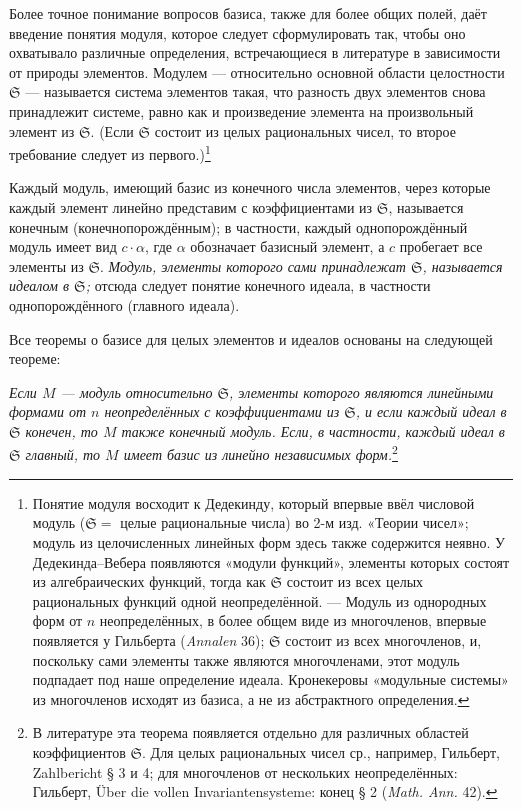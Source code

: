 \documentclass[11pt]{article}
\providecommand{\frS}{\mathfrak S}
\begin{document}
Более точное понимание вопросов базиса, также для более общих полей, даёт введение понятия модуля, которое следует сформулировать так, чтобы оно охватывало различные определения, встречающиеся в литературе в зависимости от природы элементов. Модулем --- относительно основной области целостности \(\frS\) --- называется система элементов такая, что разность двух элементов снова принадлежит системе, равно как и произведение элемента на произвольный элемент из \(\frS\). (Если \(\frS\) состоит из целых рациональных чисел, то второе требование следует из первого.)\footnote{Понятие модуля восходит к Дедекинду, который впервые ввёл числовой модуль (\(\frS=\) целые рациональные числа) во 2-м изд. «Теории чисел»; модуль из целочисленных линейных форм здесь также содержится неявно. У Дедекинда--Вебера появляются «модули функций», элементы которых состоят из алгебраических функций, тогда как \(\frS\) состоит из всех целых рациональных функций одной неопределённой. --- Модуль из однородных форм от \(n\) неопределённых, в более общем виде из многочленов, впервые появляется у Гильберта (\emph{Annalen} 36); \(\frS\) состоит из всех многочленов, и, поскольку сами элементы также являются многочленами, этот модуль подпадает под наше определение идеала. Кронекеровы «модульные системы» из многочленов исходят из базиса, а не из абстрактного определения.}

Каждый модуль, имеющий базис из конечного числа элементов, через которые каждый элемент линейно представим с коэффициентами из \(\frS\), называется конечным (конечнопорождённым); в частности, каждый однопорождённый модуль имеет вид \(c\cdot\alpha\), где \(\alpha\) обозначает базисный элемент, а \(c\) пробегает все элементы из \(\frS\). \emph{Модуль, элементы которого сами принадлежат \(\frS\), называется идеалом в \(\frS\);} отсюда следует понятие конечного идеала, в частности однопорождённого (главного идеала).

Все теоремы о базисе для целых элементов и идеалов основаны на следующей теореме:

\emph{Если \(M\) --- модуль относительно \(\frS\), элементы которого являются линейными формами от \(n\) неопределённых с коэффициентами из \(\frS\), и если каждый идеал в \(\frS\) конечен, то \(M\) также конечный модуль. Если, в частности, каждый идеал в \(\frS\) главный, то \(M\) имеет базис из линейно независимых форм.}\footnote{В литературе эта теорема появляется отдельно для различных областей коэффициентов \(\frS\). Для целых рациональных чисел ср., например, Гильберт, Zahlbericht § 3 и 4; для многочленов от нескольких неопределённых: Гильберт, Über die vollen Invariantensysteme: конец § 2 (\emph{Math. Ann.} 42).}
\end{document}
